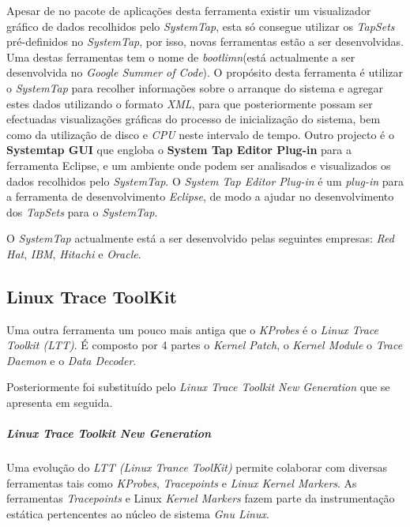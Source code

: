 Apesar de no pacote de aplicações desta ferramenta existir um visualizador gráfico de dados recolhidos pelo \textit{SystemTap}, esta só consegue utilizar os \textit{TapSets} pré-definidos no \textit{SystemTap}, por isso, novas ferramentas estão a ser desenvolvidas.
Uma destas ferramentas tem o nome de \textit{bootlimn}(está actualmente a ser desenvolvida no \textit{Google Summer of Code}).
O propósito desta ferramenta é utilizar o \textit{SystemTap} para recolher informações sobre o arranque do sistema e agregar estes dados utilizando o formato \textit{XML}, para que posteriormente possam ser efectuadas visualizações gráficas do processo de inicialização do sistema, bem como da utilização de disco e \textit{CPU} neste intervalo de tempo.
Outro projecto é o \textbf{Systemtap GUI} que engloba o \textbf{System Tap Editor Plug-in} para a ferramenta Eclipse, e um ambiente onde podem ser analisados e visualizados os dados recolhidos pelo \textit{SystemTap}.
O \textit{System Tap Editor Plug-in} é um \textit{plug-in} para a ferramenta de desenvolvimento \textit{Eclipse}, de modo a ajudar no desenvolvimento dos \textit{TapSets} para o \textit{SystemTap}.

O \textit{SystemTap} actualmente está a ser desenvolvido pelas seguintes empresas: \textit{Red Hat}, \textit{IBM}, \textit{Hitachi} e \textit{Oracle}.

\subsection{Linux Trace ToolKit}\label{cap:linux_trace_toolkit_overview}

Uma outra ferramenta um pouco mais antiga que o \textit{KProbes} é o \textit{Linux Trace Toolkit (LTT)}.
É composto por 4 partes o \textit{Kernel Patch}, o \textit{Kernel Module} o \textit{Trace Daemon} e o \textit{Data Decoder}.

Posteriormente foi substituído pelo \textit{Linux Trace Toolkit New Generation} que se apresenta em seguida.

\subparagraph{Linux Trace Toolkit New Generation}\label{cap:lttng_overview}


Uma evolução do \textit{LTT (Linux Trance ToolKit)} permite colaborar com diversas ferramentas tais como \textit{KProbes}, \textit{Tracepoints}\cite{Mathieu2009} e \textit{Linux Kernel Markers}\cite{Mathieu2009}.
As ferramentas \textit{Tracepoints} e Linux \textit{Kernel Markers} fazem parte da instrumentação estática pertencentes ao núcleo de sistema \textit{Gnu Linux}.

